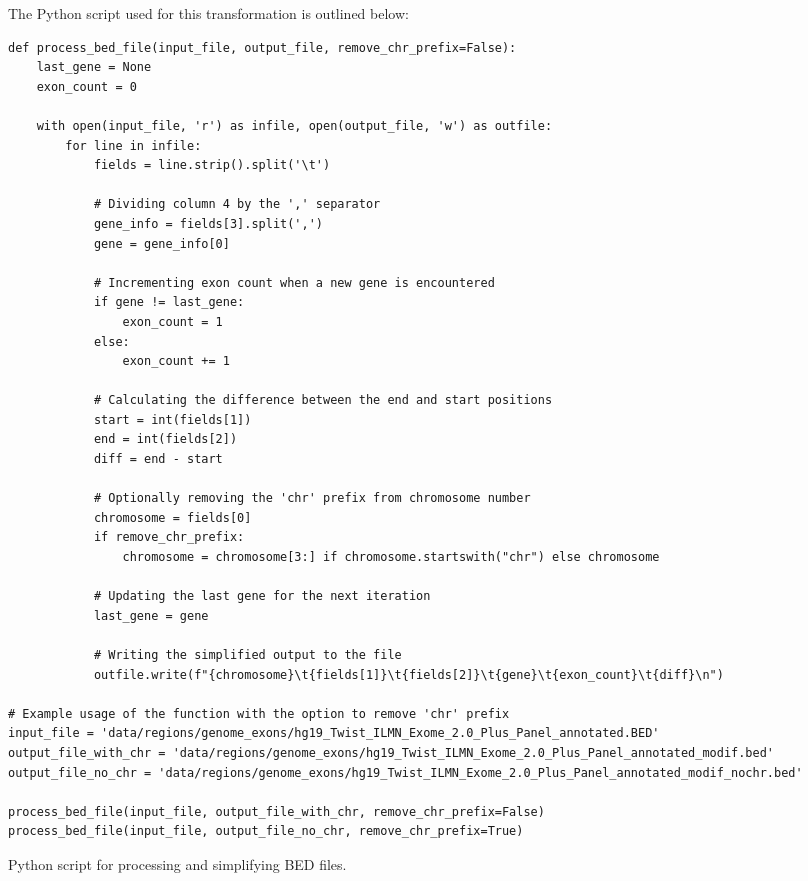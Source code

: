 The Python script used for this transformation is outlined below:

\begin{longlisting}
\begin{verbatim}
def process_bed_file(input_file, output_file, remove_chr_prefix=False):
    last_gene = None
    exon_count = 0
    
    with open(input_file, 'r') as infile, open(output_file, 'w') as outfile:
        for line in infile:
            fields = line.strip().split('\t')
            
            # Dividing column 4 by the ',' separator
            gene_info = fields[3].split(',')
            gene = gene_info[0]
            
            # Incrementing exon count when a new gene is encountered
            if gene != last_gene:
                exon_count = 1
            else:
                exon_count += 1
            
            # Calculating the difference between the end and start positions
            start = int(fields[1])
            end = int(fields[2])
            diff = end - start
            
            # Optionally removing the 'chr' prefix from chromosome number
            chromosome = fields[0]
            if remove_chr_prefix:
                chromosome = chromosome[3:] if chromosome.startswith("chr") else chromosome
            
            # Updating the last gene for the next iteration
            last_gene = gene
            
            # Writing the simplified output to the file
            outfile.write(f"{chromosome}\t{fields[1]}\t{fields[2]}\t{gene}\t{exon_count}\t{diff}\n")

# Example usage of the function with the option to remove 'chr' prefix
input_file = 'data/regions/genome_exons/hg19_Twist_ILMN_Exome_2.0_Plus_Panel_annotated.BED'
output_file_with_chr = 'data/regions/genome_exons/hg19_Twist_ILMN_Exome_2.0_Plus_Panel_annotated_modif.bed'
output_file_no_chr = 'data/regions/genome_exons/hg19_Twist_ILMN_Exome_2.0_Plus_Panel_annotated_modif_nochr.bed'

process_bed_file(input_file, output_file_with_chr, remove_chr_prefix=False)
process_bed_file(input_file, output_file_no_chr, remove_chr_prefix=True)
\end{verbatim}
\caption{Python script for processing and simplifying BED files.}
\label{lbl:bed_script}
\end{longlisting}

